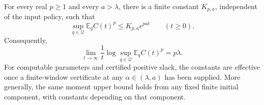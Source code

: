 \begin{theorem}
\label{cm:all-moments}
For every real $p\ge1$ and every $a>\lambda$, there is a finite constant
$K_{p,a}$, independent of the input policy, such that
\begin{equation}\label{cm:bound}
 \sup_{q\in\mathcal Q}\mathbb E_q C(t)^p
 \le K_{p,a}e^{pa t}\qquad(t\ge0).
\end{equation}
Consequently,
\begin{equation}\label{cm:exponent}
 \boxed{\lim_{t\to\infty}\frac1t
 \log\sup_{q\in\mathcal Q}\mathbb E_q C(t)^p=p\lambda.}
\end{equation}
For computable parameters and certified positive slack, the constants
are effective once a finite-window certificate at any
$\alpha\in(\lambda,a)$ has been supplied. More generally, the same
moment upper bound holds from any fixed finite initial component, with
constants depending on that component.
\end{theorem}
